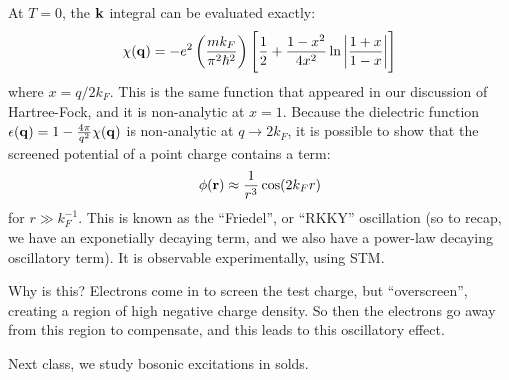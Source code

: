 At $T = 0$, the $\mathbf{k}$ integral can be evaluated exactly:
\begin{equation}
    \chi(\mathbf{q}) = -e^2\left(\frac{mk_F}{\pi^2\hbar^2}\right)\left[\frac{1}{2} + \frac{1-x^2}{4x^2}\ln\left|\frac{1+x}{1-x}\right|\right]
\end{equation}
where $x = q/2k_F$. This is the same function that appeared in our discussion of Hartree-Fock, and it is non-analytic at $x = 1$. Because the dielectric function $\epsilon(\mathbf{q}) = 1 - \frac{4\pi}{q^2}\chi(\mathbf{q})$ is non-analytic at $q \to 2k_F$, it is possible to show that the screened potential of a point charge contains a term:
\begin{equation}
    \phi(\mathbf{r}) \approx \frac{1}{r^3}\cos(2k_F r)
\end{equation}
for $r \gg k_F^{-1}$. This is known as the ``Friedel'', or ``RKKY'' oscillation (so to recap, we have an exponetially decaying term, and we also have a power-law decaying oscillatory term). It is observable experimentally, using STM.

Why is this? Electrons come in to screen the test charge, but ``overscreen'', creating a region of high negative charge density. So then the electrons go away from this region to compensate, and this leads to this oscillatory effect.

Next class, we study bosonic excitations in solds.